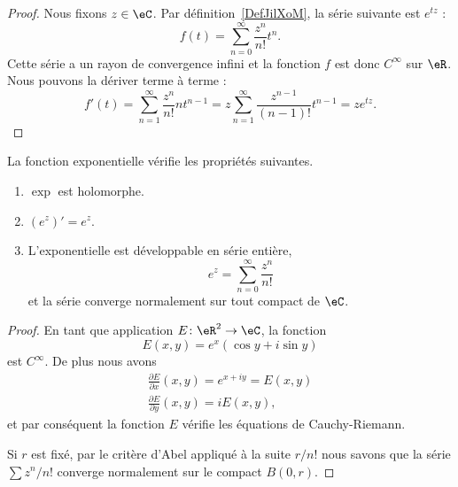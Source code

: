 \begin{proof}
    Nous fixons \( z\in \eC\). Par définition~\ref{DefJilXoM}, la série suivante est \(  e^{tz}\) :
    \begin{equation}
        f(t)=\sum_{n=0}^{\infty}\frac{ z^n }{ n! }t^n.
    \end{equation}
    Cette série a un rayon de convergence infini et la fonction \( f\) est donc \(  C^{\infty}\) sur \( \eR\). Nous pouvons la dériver terme à terme :
    \begin{equation}
            f'(t)=\sum_{n=1}^{\infty}\frac{ z^n }{ n! }nt^{n-1}
            =z\sum_{n=1}^{\infty}\frac{ z^{n-1} }{ (n-1)! }t^{n-1}
            =z e^{tz}.
    \end{equation}
\end{proof}

\begin{theorem}
    La fonction exponentielle vérifie les propriétés suivantes.
    \begin{enumerate}
        \item
            \( \exp\) est holomorphe.
        \item
            \( (e^z)'=e^z\).
        \item
            L'exponentielle est développable en série entière,
            \begin{equation}
                e^z=\sum_{n=0}^{\infty}\frac{ z^n }{ n! }
            \end{equation}
            et la série converge normalement sur tout compact de \( \eC\).
    \end{enumerate}
\end{theorem}

\begin{proof}
    En tant que application \( E\colon \eR^2\to \eC\), la fonction
    \begin{equation}
        E(x,y)=e^x(\cos y+i\sin y)
    \end{equation}
    est \( C^{\infty}\). De plus nous avons
    \begin{subequations}
        \begin{align}
            \frac{ \partial E }{ \partial x }(x,y)= e^{x+iy}=E(x,y)\\
            \frac{ \partial E }{ \partial y }(x,y)=iE(x,y),
        \end{align}
    \end{subequations}
    et par conséquent la fonction \( E\) vérifie les équations de Cauchy-Riemann.

    Si \( r\) est fixé, par le critère d'Abel appliqué à la suite \(r/n!\) nous savons que la série \( \sum z^n/n!\) converge normalement sur le compact \( B(0,r)\).
\end{proof}

